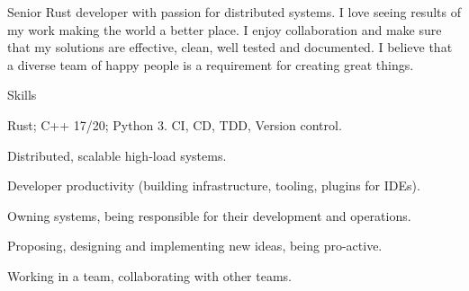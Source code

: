 \documentclass{resume}
\begin{document}
    Senior Rust developer with passion for distributed systems.
    I love seeing results of my work making the world a better place.
    I enjoy collaboration and
    make sure that my solutions are
    effective, clean, well tested and documented.
    I believe that a diverse team of happy people
    is a requirement for creating great things.

    \begin{rSection}{Skills}
        \begin{rSubsection}{}{}{}{}
            \item
                Rust;
                C++ 17/20;
                Python 3.
                CI, CD, TDD, Version control.
            \item
                Distributed, scalable high-load systems.
            \item
                Developer productivity
                (building infrastructure, tooling, plugins for IDEs).
        \end{rSubsection}
        \begin{rSubsection}{}{}{}{}
            \item
                Owning systems,
                being responsible for their development and operations.
            \item
                Proposing, designing and implementing new ideas,
                being pro-active.
            \item
                Working in a team,
                collaborating with other teams.
        \end{rSubsection}
    \end{rSection}
\end{document}
